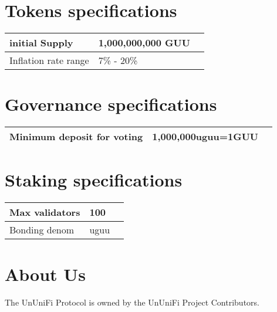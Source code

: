 \documentclass[dvipdfmx]{jsarticle}
\begin{document}
\section{Tokens specifications}

\begin{table}[htb]
  \begin{tabular}{|l|l|l|}  \hline
    initial Supply & 1,000,000,000 GUU \\ \hline
    Inflation rate range & 7\% - 20\% \\ \hline
  \end{tabular}
\end{table}

\section{Governance specifications}

\begin{table}[htb]
  \begin{tabular}{|l|l|l|}  \hline
    Minimum deposit for voting & 1,000,000uguu=1GUU \\ \hline
  \end{tabular}
\end{table}

\section{Staking specifications}

\begin{table}[htb]
  \begin{tabular}{|l|l|l|}  \hline
    Max validators & 100 \\ \hline
    Bonding denom & uguu \\ \hline
  \end{tabular}
\end{table}


\section{About Us}
The UnUniFi Protocol is owned by the UnUniFi Project Contributors.
\end{document}
